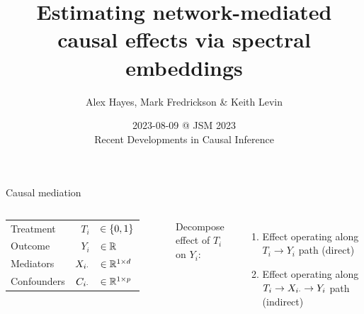 \documentclass[aspectratio=169]{beamer}
\title{Estimating network-mediated causal effects via spectral embeddings}
\date{2023-08-09 @ JSM 2023 \\ Recent Developments in Causal Inference}
\author{Alex Hayes, Mark Fredrickson \& Keith Levin}
\institute{Department of Statistics, University of Wisconsin-Madison}
\theoremstyle{remark}
\begin{document}
\maketitle

\begin{frame}{Causal mediation}

    \begin{columns}


        \begin{table}[]
            \begin{tabular}{lrl}
                Treatment   & $T_i$          & $\in \{0, 1\} $     \\
                Outcome     & $Y_i$          & $\in \mathbb{R}$              \\
                Mediators   & $X_{i \cdot}$ & $\in \mathbb{R}^{1 \times d}$ \\
                Confounders & $C_{i \cdot}$ & $\in \mathbb{R}^{1 \times p}$
            \end{tabular}
        \end{table}

        Decompose effect of $T_i$ on $Y_i$:

        \begin{enumerate}
            \item Effect operating along $T_i \to Y_i$ path (direct)
            \item Effect operating along $T_i \to X_{i \cdot} \to Y_i$ path (indirect)
        \end{enumerate}


\end{columns}
\end{frame}
\end{document}

